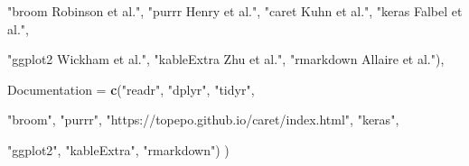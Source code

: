 \documentclass[10pt,letterpaper]{article}
\newenvironment{Shaded}{\begin{snugshade}}{\end{snugshade}}
\newcommand{\DataTypeTok}[1]{\textcolor[rgb]{0.13,0.29,0.53}{#1}}
\newcommand{\KeywordTok}[1]{\textcolor[rgb]{0.13,0.29,0.53}{\textbf{#1}}}
\newcommand{\NormalTok}[1]{#1}
\newcommand{\StringTok}[1]{\textcolor[rgb]{0.31,0.60,0.02}{#1}}
\begin{document}
\begin{Shaded}
\begin{Highlighting}[]
             \StringTok{"broom Robinson et al."}\NormalTok{,}
             \StringTok{"purrr Henry et al."}\NormalTok{,}
             \StringTok{"caret Kuhn et al."}\NormalTok{, }
             \StringTok{"keras Falbel et al."}\NormalTok{,}
                    
             \StringTok{"ggplot2 Wickham et al."}\NormalTok{,}
             \StringTok{"kableExtra Zhu et al."}\NormalTok{, }
             \StringTok{"rmarkdown Allaire et al."}\NormalTok{),}
  
  \DataTypeTok{Documentation =} \KeywordTok{c}\NormalTok{(}\StringTok{"readr"}\NormalTok{, }
                    \StringTok{"dplyr"}\NormalTok{, }
                    \StringTok{"tidyr"}\NormalTok{,}
  
                    \StringTok{"broom"}\NormalTok{,}
                    \StringTok{"purrr"}\NormalTok{,}
                    \StringTok{"https://topepo.github.io/caret/index.html"}\NormalTok{, }
                    \StringTok{"keras"}\NormalTok{,}
                    
                    \StringTok{"ggplot2"}\NormalTok{,}
                    \StringTok{"kableExtra"}\NormalTok{, }
                    \StringTok{"rmarkdown"}\NormalTok{)}
\NormalTok{)}
\end{Highlighting}
\end{Shaded}
\end{document}
